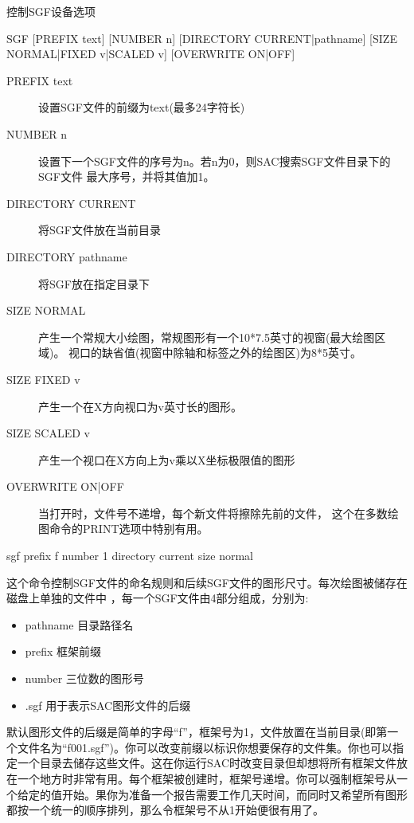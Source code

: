 \label{cmd:sgf}

控制SGF设备选项

\begin{SACSTX}
SGF [PREFIX text] [NUMBER n] [DIRECTORY CURRENT|pathname]
    [SIZE NORMAL|FIXED v|SCALED v] [OVERWRITE ON|OFF]
\end{SACSTX}

\begin{description}
\item [PREFIX text] 设置SGF文件的前缀为text(最多24字符长)
\item [NUMBER n] 设置下一个SGF文件的序号为n。若n为0，则SAC搜索SGF文件目录下的SGF文件
    最大序号，并将其值加1。
\item [DIRECTORY CURRENT] 将SGF文件放在当前目录
\item [DIRECTORY pathname] 将SGF放在指定目录下
\item [SIZE NORMAL] 产生一个常规大小绘图，常规图形有一个10*7.5英寸的视窗(最大绘图区域)。
    视口的缺省值(视窗中除轴和标签之外的绘图区)为8*5英寸。
\item [SIZE FIXED v] 产生一个在X方向视口为v英寸长的图形。
\item [SIZE SCALED v] 产生一个视口在X方向上为v乘以X坐标极限值的图形
\item [OVERWRITE ON|OFF] 当打开时，文件号不递增，每个新文件将擦除先前的文件，
    这个在多数绘图命令的PRINT选项中特别有用。
\end{description}

\begin{SACDFT}
sgf prefix f number 1 directory current size normal
\end{SACDFT}

这个命令控制SGF文件的命名规则和后续SGF文件的图形尺寸。每次绘图被储存在磁盘上单独的文件中
，每一个SGF文件由4部分组成，分别为:
\begin{itemize}
\item pathname 目录路径名
\item prefix 框架前缀
\item number 三位数的图形号
\item .sgf 用于表示SAC图形文件的后缀
\end{itemize}

默认图形文件的后缀是简单的字母``f''，框架号为1，文件放置在当前目录(即第一个文件名为``f001.sgf'')。你可以改变前缀以标识你想要保存的文件集。你也可以指定一个目录去储存这些文件。这在你运行SAC时改变目录但却想将所有框架文件放在一个地方时非常有用。每个框架被创建时，框架号递增。你可以强制框架号从一个给定的值开始。果你为准备一个报告需要工作几天时间，而同时又希望所有图形都按一个统一的顺序排列，那么令框架号不从1开始便很有用了。

